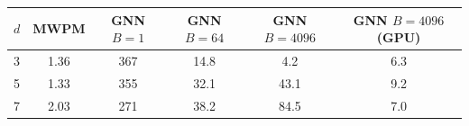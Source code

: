 \begin{tabular}{lccccc}
\toprule
$d$ & MWPM & GNN $B{=}1$ & GNN $B{=}64$ & GNN $B{=}4096$ & GNN $B{=}4096$ (GPU) \\
\midrule
3 & 1.36 & 367 & 14.8 & 4.2 & 6.3 \\
5 & 1.33 & 355 & 32.1 & 43.1 & 9.2 \\
7 & 2.03 & 271 & 38.2 & 84.5 & 7.0 \\
\bottomrule
\end{tabular}
